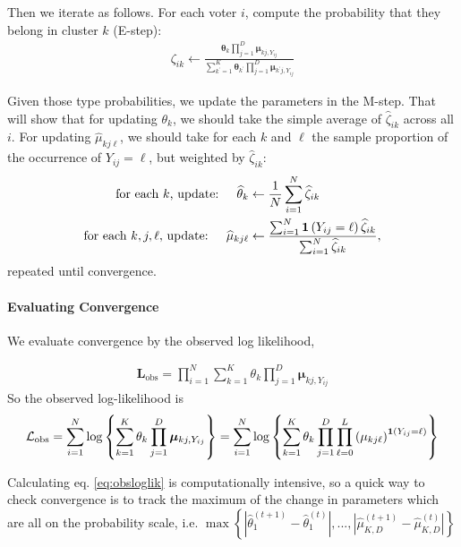\documentclass[11pt]{article}
\begin{document}
Then we iterate as follows. For each voter \(i\), compute the probability that they belong in cluster \(k\) (E-step):
\begin{align}
\zeta_{ik} \leftarrow \frac{\bm{\theta}_{k}\prod^{D}_{j=1}\bm{\mu}_{kj,Y_{ij}}}
{\sum^{K}_{k^\prime=1}\bm{\theta}_{k^\prime}\prod^{D}_{j=1}\bm{\mu}_{k^\prime j,Y_{ij}}}
\end{align}

Given those type probabilities, we update the parameters in the M-step. That will show that for updating \(\theta_k\), we should take the simple average of \(\widehat\zeta_{ik}\) across all \(i\). For updating \(\widehat\mu_{kj\ell}\), we should take for each \(k\) and \(\ell\) the sample proportion of the occurrence of \(Y_{ij} = \ell\), but weighted by \(\widehat\zeta_{ik}\):
\begin{align}
\text{for each \(k\), update: }~~~  \widehat{\theta}_{k} &\leftarrow \frac{1}{N}\sum^N_{i = 1}\widehat{\zeta}_{ik} \\
\text{for each \(k, j, \ell\), update: }~~~ \widehat{\mu}_{kj\ell} &\leftarrow\frac{\sum^N_{i=1}\bm{1}\left(Y_{ij} = \ell\right)\widehat{\zeta}_{ik}}{\sum^{N}_{i=1}\widehat{\zeta}_{ik}},
\end{align}
repeated  until convergence.

\paragraph{Evaluating Convergence} We evaluate convergence by the observed log likelihood, 

\begin{align*}
\mathbf{L}_{\text{obs}} = \prod^N_{i=1}\sum^{K}_{k=1}\theta_k \prod^{D}_{j=1}\bm{\mu}_{kj,Y_{ij}}
\end{align*}
So the observed log-likelihood is
\begin{align}
\mathcal{L}_{\text{obs}} = \sum^{N}_{i=1}\log \left\{\sum^{K}_{k=1}\theta_k \prod^{D}_{j=1}\bm{\mu}_{kj,Y_{ij}}\right\} = \sum^{N}_{i=1}\log \left\{\sum^{K}_{k=1}\theta_k \prod^{D}_{j=1}\prod^{L}_{\ell = 0}\left(\mu_{kj\ell}\right)^{\bm{1}\left(Y_{ij} = \ell\right)}\right\} \label{eq:obsloglik}
\end{align}

Calculating eq. \ref{eq:obsloglik} is computationally intensive, so a quick way to check convergence is to track the maximum of the change in parameters which are all on the probability scale, i.e. \(\max\left\{|\widehat\theta^{(t + 1)}_{1} - \widehat\theta^{(t)}_{1}|, ..., |\widehat\mu^{(t + 1)}_{K,D} - \widehat\mu^{(t)}_{K,D}|\right\}\)
\end{document}
